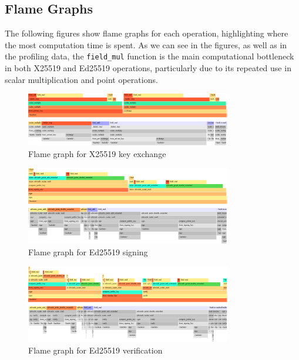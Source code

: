 \documentclass[twoside,a4paper,12pt]{article}
\begin{document}
\subsection{Flame Graphs}

The following figures show flame graphs for each operation, highlighting where the most computation time is spent. As we can see in the figures, as well as in the profiling data, the \texttt{field\_mul} function is the main computational bottleneck in both X25519 and Ed25519 operations, particularly due to its repeated use in scalar multiplication and point operations.

\begin{figure}[h]
    \centering
    \includegraphics[width=0.8\textwidth]{Figs/x25519.pdf}
    \caption{Flame graph for X25519 key exchange}
    \label{fig:x25519_flamegraph}
\end{figure}

\begin{figure}[h]
    \centering
    \includegraphics[width=0.8\textwidth]{Figs/ed25519sign.pdf}
    \caption{Flame graph for Ed25519 signing}
    \label{fig:ed25519_signing_flamegraph}
\end{figure}

\begin{figure}[h]
    \centering
    \includegraphics[width=0.8\textwidth]{Figs/ed25519verify.pdf}
    \caption{Flame graph for Ed25519 verification}
    \label{fig:ed25519_verification_flamegraph}
\end{figure}

\end{document}
